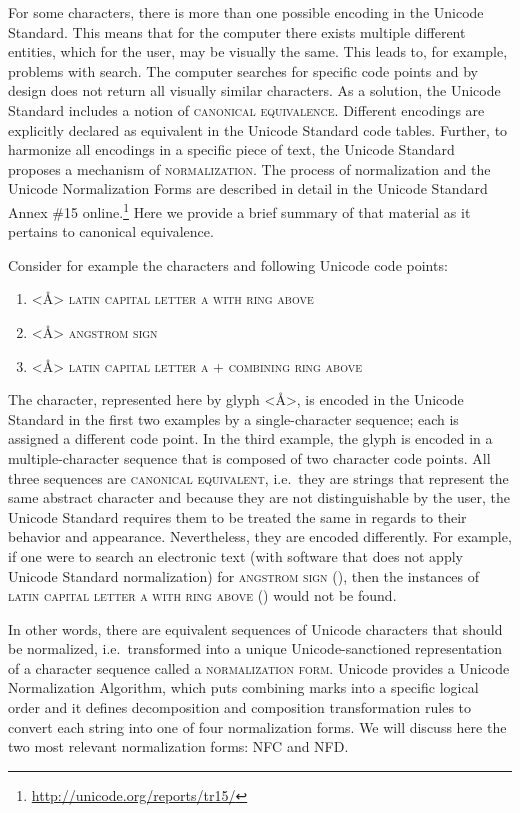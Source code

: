 For some characters, there is more than one possible encoding in the Unicode
Standard. This means that for the computer
there exists multiple different entities, which for the user, may be visually the same. This
leads to, for example, problems with search. The computer searches for specific 
code points and by design does not return all visually similar characters.
As a solution, the Unicode Standard includes a notion of \textsc{canonical
equivalence}. Different encodings are explicitly declared as equivalent in the
Unicode Standard code tables. Further, to harmonize all encodings in a specific
piece of text, the Unicode Standard proposes a mechanism of
\textsc{normalization}. The process of normalization and the 
Unicode Normalization Forms are described 
in detail in the Unicode Standard Annex \#15 online.\footnote{\url{http://unicode.org/reports/tr15/}} 
Here we provide a brief summary of that material as it pertains to canonical equivalence.

Consider for example the characters and following Unicode code points:
\begin{enumerate}
	\def\labelenumi{\arabic{enumi}.} 
	\item <Å> \textsc{latin capital letter a with ring above}  
	\item <Å> \textsc{angstrom sign} 
	\item <Å> \textsc{latin capital letter a} 
	+ \textsc{combining ring above} 
\end{enumerate}

\noindent The character, represented here by glyph <Å>, is encoded in the Unicode Standard
in the first two examples by a single-character sequence; each is assigned a
different code point. In the third example, the glyph is encoded in a
multiple-character sequence that is composed of two character code points. All
three sequences are \textsc{canonical equivalent}, i.e.~they are strings that
represent the same abstract character and because they are not distinguishable
by the user, the Unicode Standard requires them to be treated the same in
regards to their behavior and appearance. Nevertheless, they are encoded
differently. For example, if one were to search an electronic text (with
software that does not apply Unicode Standard normalization) for
\textsc{angstrom sign} (), then the instances of \textsc{latin 
capital letter a with ring above} () would not be found.

In other words, there are equivalent sequences of Unicode characters that should
be normalized, i.e.~transformed into a unique Unicode-sanctioned representation
of a character sequence called a \textsc{normalization form}. Unicode provides a
Unicode Normalization Algorithm, which puts combining marks
into a specific logical order and it defines decomposition and composition
transformation rules to convert each string into one of four normalization
forms. We will discuss here the two most relevant normalization forms: NFC and
NFD.

